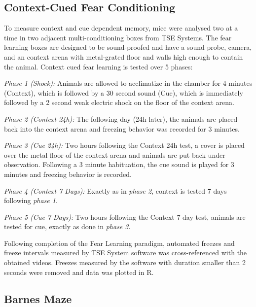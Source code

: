 \documentclass[onehalf,12pt]{beavtex}
\begin{document}
  \subsection{Context-Cued Fear
  Conditioning}\label{context-cued-fear-conditioning}
  
  To measure context and cue dependent memory, mice were analysed two at a
  time in two adjacent multi-conditioning boxes from TSE Systems. The fear
  learning boxes are designed to be sound-proofed and have a sound probe,
  camera, and an context arena with metal-grated floor and walls high
  enough to contain the animal. Context cued fear learning is tested over
  5 phases:
  
  \emph{Phase 1 (Shock):} Animals are allowed to acclimatize in the
  chamber for 4 minutes (Context), which is followed by a 30 second sound
  (Cue), which is immediately followed by a 2 second weak electric shock
  on the floor of the context arena.
  
  \emph{Phase 2 (Context 24h):} The following day (24h later), the animals
  are placed back into the context arena and freezing behavior was
  recorded for 3 minutes.
  
  \emph{Phase 3 (Cue 24h):} Two hours following the Context 24h test, a
  cover is placed over the metal floor of the context arena and animals
  are put back under observation. Following a 3 minute habituation, the
  cue sound is played for 3 minutes and freezing behavior is recorded.
  
  \emph{Phase 4 (Context 7 Days):} Exactly as in \emph{phase 2}, context
  is tested 7 days following \emph{phase 1}.
  
  \emph{Phase 5 (Cue 7 Days):} Two hours following the Context 7 day test,
  animals are tested for cue, exactly as done in \emph{phase 3}.
  
  Following completion of the Fear Learning paradigm, automated freezes
  and freeze intervals measured by TSE System software was
  cross-referenced with the obtained videos. Freezes measured by the
  software with duration smaller than 2 seconds were removed and data was
  plotted in R.
  
  \subsection{Barnes Maze}\label{Barnesmeth}
  
\end{document}

